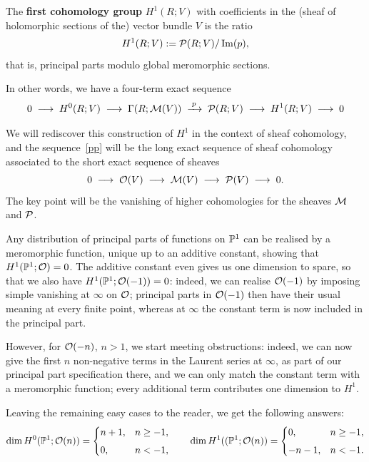 \documentclass[12pt]{article}
\begin{document}
\begin{definition}
The \textbf{first cohomology group} $H^{1}(R;V)$ with coefficients in the 
(sheaf of holomorphic sections of the) vector bundle $V$ is the ratio
\[
H^{1}(R;V) := \cP(R;V)/\operatorname{Im}(p),
\]
that is, principal parts modulo global meromorphic sections.
\end{definition}

In other words, we have a four-term exact sequence
\begin{equation}
0 \;\longrightarrow\; H^{0}(R;V) \;\longrightarrow\; 
\Gamma(R;\cM(V)) \;\xrightarrow{\;p\;}\; 
\cP(R;V) \;\longrightarrow\; H^{1}(R;V) \;\longrightarrow\; 0
\label{pp}
\end{equation}

\begin{remark}
We will rediscover this construction of $H^{1}$ in the context of 
sheaf cohomology, and the sequence~\eqref{pp} will be the long exact sequence of 
sheaf cohomology associated to the short exact sequence of sheaves
\[
0 \;\longrightarrow\; \cO(V) \;\longrightarrow\; 
\cM(V) \;\longrightarrow\; \cP(V) \;\longrightarrow\; 0.
\]
The key point will be the vanishing of higher cohomologies for the sheaves 
$\cM$ and $\cP$.
\end{remark}

\begin{example}
    Any distribution of principal parts of functions on $\P^{1}$ can be realised 
by a meromorphic function, unique up to an additive constant, showing that 
$H^{1}(\P^{1};\cO)=0$.  
The additive constant even gives us one dimension to spare, so that we also 
have $H^{1}(\P^{1};\cO(-1))=0$: indeed, we can realise $\cO(-1)$ by imposing 
simple vanishing at $\infty$ on $\cO$; principal parts in $\cO(-1)$ then have 
their usual meaning at every finite point, whereas at $\infty$ the constant 
term is now included in the principal part.  

However, for $\cO(-n)$, $n>1$, we start meeting obstructions: indeed, we can 
now give the first $n$ non-negative terms in the Laurent series at $\infty$, 
as part of our principal part specification there, and we can only match the 
constant term with a meromorphic function; every additional term contributes 
one dimension to $H^{1}$.  

Leaving the remaining easy cases to the reader, we get the following answers:
\[
\dim H^{0}(\P^{1};\cO(n))
=
\begin{cases}
n+1, & n\ge -1,\\[4pt]
0,   & n < -1,
\end{cases}
\qquad
\dim H^{1}((\P^{1};\cO(n))
=
\begin{cases}
0,        & n\ge -1,\\[4pt]
-n-1,     & n < -1.
\end{cases}
\]
\end{example}
\end{document}

